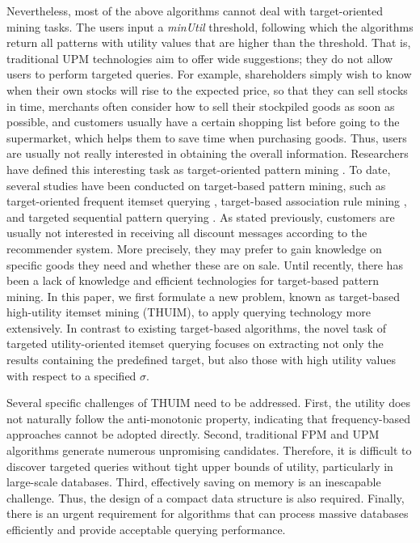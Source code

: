 \documentclass[journal]{IEEEtran}
\begin{document}
Nevertheless, most of the above algorithms cannot deal with target-oriented mining tasks. The users input a \textit{minUtil} threshold, following which the algorithms return all patterns with utility values that are higher than the threshold. That is, traditional UPM technologies aim to offer wide suggestions; they do not allow users to perform targeted queries. For example, shareholders simply wish to know when their own stocks will rise to the expected price, so that they can sell stocks in time, merchants often consider how to sell their stockpiled goods as soon as possible, and customers usually have a certain shopping list before going to the supermarket, which helps them to save time when purchasing goods. Thus, users are usually not really interested in obtaining the overall  information. Researchers have defined this interesting task as target-oriented pattern mining \cite{kubat2003itemset}. To date, several studies have been conducted on target-based pattern mining, such as target-oriented frequent itemset querying \cite{shabtay2018guided}, target-based association rule mining \cite{abeysinghe2017query, fournier2013meit}, and targeted sequential pattern querying \cite{chand2012target, chueh2010mining, zhang2021tusq}. As stated previously, customers are usually not interested in receiving all discount messages according to the recommender system. More precisely, they may prefer to gain knowledge on specific goods they need and whether these are on sale. Until recently, there has been a lack of knowledge and efficient technologies for target-based pattern mining. In this paper, we first formulate a new problem, known as target-based high-utility itemset mining (THUIM), to apply querying technology more extensively. In contrast to existing target-based algorithms, the novel task of targeted utility-oriented itemset querying focuses on extracting not only the results containing the predefined target, but also those with high utility values with respect to a specified $\sigma$.


Several specific challenges of THUIM need to be addressed. First, the utility does not naturally follow the anti-monotonic property, indicating that frequency-based approaches cannot be adopted directly. Second, traditional FPM and UPM algorithms generate numerous unpromising candidates. Therefore, it is difficult to discover targeted queries without tight upper bounds of utility, particularly in large-scale databases. Third, effectively saving on memory is an inescapable challenge. Thus, the design of a compact data structure is also required. Finally, there is an urgent requirement for algorithms that can process massive databases efficiently and provide acceptable querying performance. 
\end{document}
